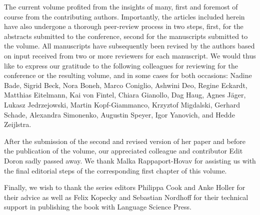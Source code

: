 \begin{refsection}

The current volume profited from the insights of many, first and foremost of course from the contributing authors. Importantly, the articles included herein have also undergone a thorough peer-review process in two steps, first, for the abstracts submitted to the conference, second for the manuscripts submitted to the volume. All manuscripts have subsequently been revised by the authors based on input received from two or more reviewers for each manuscript. We would thus like to express our gratitude to the following colleagues for reviewing for the conference or the resulting volume, and in some cases for both occasions: Nadine Bade, Sigrid Beck, Nora Boneh, Marco Coniglio, Ashwini Deo, Regine Eckardt, Matthias Eitelmann, Kai von Fintel, Chiara Gianollo, Dag Haug, Agnes Jäger, Lukasz Jedrzejowski, Martin Kopf-Giammanco, Krzyztof Migdalski, Gerhard Schade, Alexandra Simonenko, Augustin Speyer, Igor Yanovich, and Hedde Zeijlstra. 

After the submission of the second and revised version of her paper and before the publication of the volume, our appreciated colleague and contributor Edit Doron sadly passed away. We thank Malka Rappaport-Hovav for assisting us with the final editorial steps of the corresponding first chapter of this volume. 

Finally, we wish to thank the series editors Philippa Cook and Anke Holler for their advice as well as Felix Kopecky and Sebastian Nordhoff for their technical support in publishing the book with Language Science Press.

\printbibliography[heading=subbibliography]
\end{refsection}

